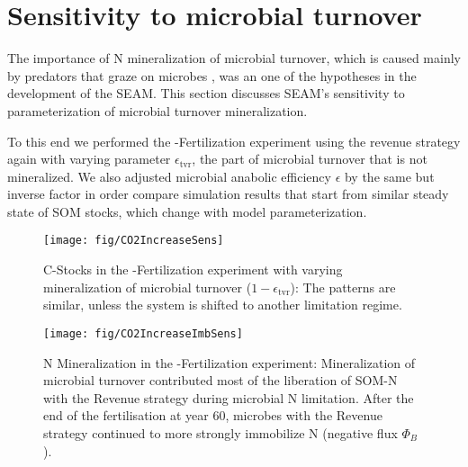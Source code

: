 \section{Sensitivity to microbial turnover \label{app:TvrSens}}

The importance of N mineralization of microbial turnover, which is caused mainly
by predators that graze on microbes \citep{Clarholm85, Raynaud06}, was an
one of the hypotheses in the development of the SEAM.
This section discusses SEAM's sensitivity to parameterization of microbial
turnover mineralization.

To this end we performed the -Fertilization experiment using the revenue
strategy again with varying parameter $\epsilon_{\operatorname{tvr}}$, the part
of microbial turnover that is not mineralized. We also adjusted microbial
anabolic efficiency $\epsilon$ by the same but inverse factor in order compare
simulation results that start from similar steady state of SOM stocks, which
change with model parameterization.

\begin{figure}[t] \vspace*{2mm}
\begin{center}
\texttt{[image: fig/CO2IncreaseSens]}
\end{center}
\caption{
C-Stocks in the -Fertilization experiment with varying
mineralization of microbial turnover ($1-\epsilon_{\operatorname{tvr}}$): The
patterns are similar, unless the system is shifted to another limitation regime.
\label{fig:CO2IncreaseSens}}

\end{figure}
\begin{figure}[t] \vspace*{2mm}
\begin{center}
\texttt{[image: fig/CO2IncreaseImbSens]} 
\end{center}
\caption{
N Mineralization in the -Fertilization experiment:
Mineralization of microbial turnover contributed most of the liberation of SOM-N
with the Revenue strategy during microbial N limitation.
After the end of the fertilisation at year 60, microbes with the Revenue
strategy continued to more strongly immobilize N (negative flux $\Phi_B$).
\label{fig:CO2IncreaseImbSens}}
\end{figure}

